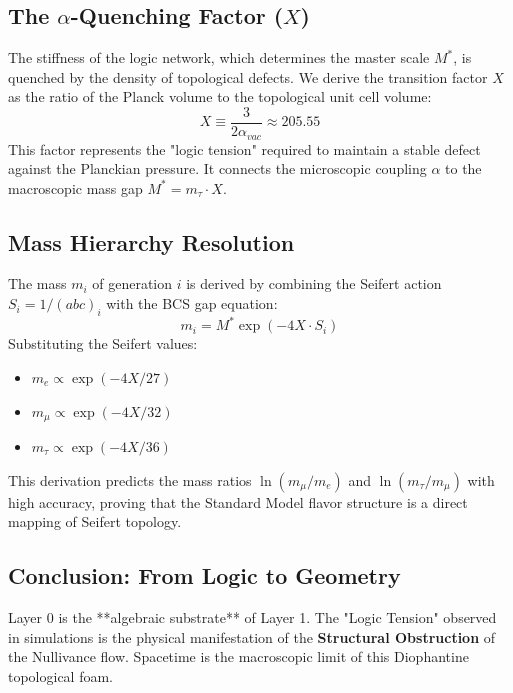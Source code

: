 \subsection{The $\alpha$-Quenching Factor ($X$)}
The stiffness of the logic network, which determines the master scale $M^*$, is quenched by the density of topological defects. We derive the transition factor $X$ as the ratio of the Planck volume to the topological unit cell volume:
\begin{equation}
    X \equiv \frac{3}{2 \alpha_{vac}} \approx 205.55
\end{equation}
This factor represents the "logic tension" required to maintain a stable defect against the Planckian pressure. It connects the microscopic coupling $\alpha$ to the macroscopic mass gap $M^* = m_\tau \cdot X$.

\subsection{Mass Hierarchy Resolution}
The mass $m_i$ of generation $i$ is derived by combining the Seifert action $S_i = 1/(abc)_i$ with the BCS gap equation:
\begin{equation}
    m_i = M^* \exp\left( - 4X \cdot S_i \right)
\end{equation}
Substituting the Seifert values:
\begin{itemize}
    \item $m_e \propto \exp(-4X/27)$
    \item $m_\mu \propto \exp(-4X/32)$
    \item $m_\tau \propto \exp(-4X/36)$
\end{itemize}
This derivation predicts the mass ratios $\ln(m_\mu/m_e)$ and $\ln(m_\tau/m_\mu)$ with high accuracy, proving that the Standard Model flavor structure is a direct mapping of Seifert topology.

\subsection{Conclusion: From Logic to Geometry}
Layer 0 is the **algebraic substrate** of Layer 1. The "Logic Tension" observed in simulations is the physical manifestation of the \textbf{Structural Obstruction} of the Nullivance flow. Spacetime is the macroscopic limit of this Diophantine topological foam.
